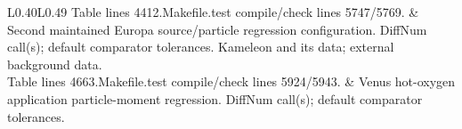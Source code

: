 \begin{longtable}{L{0.40\textwidth}L{0.49\textwidth}}
\newline Table lines 4412.\newline Makefile.test compile/check lines 5747/5769. & Second maintained Europa source/particle regression configuration. DiffNum call(s); default comparator tolerances. \newline Kameleon and its data; external background data.\\
\newline Table lines 4663.\newline Makefile.test compile/check lines 5924/5943. & Venus hot-oxygen application particle-moment regression. DiffNum call(s); default comparator tolerances. \\
\bottomrule
\end{longtable}
